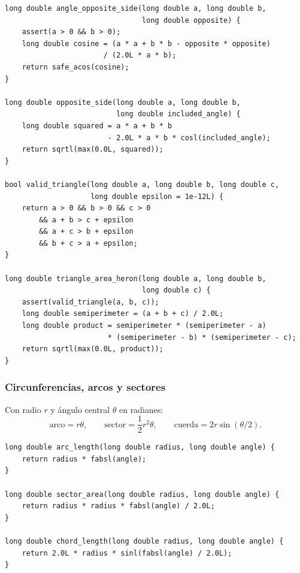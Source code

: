 \begin{lstlisting}[style=cpp]
long double angle_opposite_side(long double a, long double b,
                                long double opposite) {
    assert(a > 0 && b > 0);
    long double cosine = (a * a + b * b - opposite * opposite)
                       / (2.0L * a * b);
    return safe_acos(cosine);
}

long double opposite_side(long double a, long double b,
                          long double included_angle) {
    long double squared = a * a + b * b
                        - 2.0L * a * b * cosl(included_angle);
    return sqrtl(max(0.0L, squared));
}

bool valid_triangle(long double a, long double b, long double c,
                    long double epsilon = 1e-12L) {
    return a > 0 && b > 0 && c > 0
        && a + b > c + epsilon
        && a + c > b + epsilon
        && b + c > a + epsilon;
}

long double triangle_area_heron(long double a, long double b,
                                long double c) {
    assert(valid_triangle(a, b, c));
    long double semiperimeter = (a + b + c) / 2.0L;
    long double product = semiperimeter * (semiperimeter - a)
                        * (semiperimeter - b) * (semiperimeter - c);
    return sqrtl(max(0.0L, product));
}
\end{lstlisting}


\subsubsection{Circunferencias, arcos y sectores}

Con radio $r$ y \'angulo central $\theta$ en radianes:
\[
\text{arco}=r\theta,\qquad
\text{sector}=\frac12r^2\theta,\qquad
\text{cuerda}=2r\sin(\theta/2).
\]

\begin{lstlisting}[style=cpp]
long double arc_length(long double radius, long double angle) {
    return radius * fabsl(angle);
}

long double sector_area(long double radius, long double angle) {
    return radius * radius * fabsl(angle) / 2.0L;
}

long double chord_length(long double radius, long double angle) {
    return 2.0L * radius * sinl(fabsl(angle) / 2.0L);
}
\end{lstlisting}

